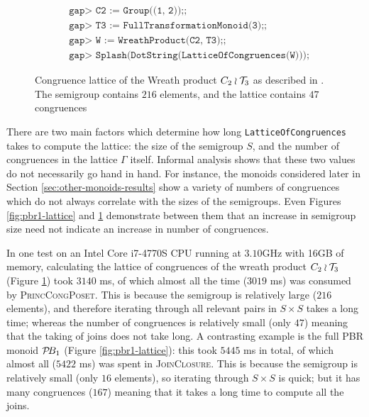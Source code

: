 \begin{figure}[ht]
  \begin{align*}
    &\texttt{gap> C2 := Group((1, 2));;} \\
    &\texttt{gap> T3 := FullTransformationMonoid(3);;} \\
    &\texttt{gap> W := WreathProduct(C2, T3);;} \\
    &\texttt{gap> Splash(DotString(LatticeOfCongruences(W)));}
  \end{align*}
  \vspace{-1.0cm}
  \caption[Congruence lattice of the Wreath product $C_2 \wr \T_3$]
  {Congruence lattice of the Wreath product $C_2 \wr \T_3$ as described in
    \cite[\S10.1]{wreath}.  The semigroup contains $216$ elements, and the
    lattice contains $47$ congruences}
  \label{fig:c2-wr-t3-lattice}
\end{figure}

There are two main factors which determine how long
\texttt{LatticeOfCongruences} takes to compute the lattice: the size of the
semigroup $S$, and the number of congruences in the lattice $\Gamma$ itself.
Informal analysis shows that these two values do not necessarily go hand in
hand.  For instance, the monoids considered later in Section
\ref{sec:other-monoids-results} show a variety of numbers of congruences which
do not always correlate with the sizes of the semigroups.  Even Figures
\ref{fig:pbr1-lattice} and \ref{fig:c2-wr-t3-lattice} demonstrate between them
that an increase in semigroup size need not indicate an increase in number of
congruences.

In one test on an Intel Core i7-4770S CPU running at $3.10$GHz with 16GB of
memory, calculating the lattice of congruences of the wreath product
$C_2 \wr \T_3$ (Figure \ref{fig:c2-wr-t3-lattice}) took $3140$ ms, of which
almost all the time ($3019$ ms) was consumed by \textsc{PrincCongPoset}.  This
is because the semigroup is relatively large ($216$ elements), and therefore
iterating through all relevant pairs in $S \times S$ takes a long time; whereas
the number of congruences is relatively small (only $47$) meaning that the
taking of joins does not take long.  A contrasting example is the full PBR
monoid $\mathcal{P}\!B_1$ (Figure \ref{fig:pbr1-lattice}): this took $5445$ ms in total,
of which almost all ($5422$ ms) was spent in \textsc{JoinClosure}.  This is
because the semigroup is relatively small (only $16$ elements), so iterating
through $S \times S$ is quick; but it has many congruences ($167$) meaning that
it takes a long time to compute all the joins.


